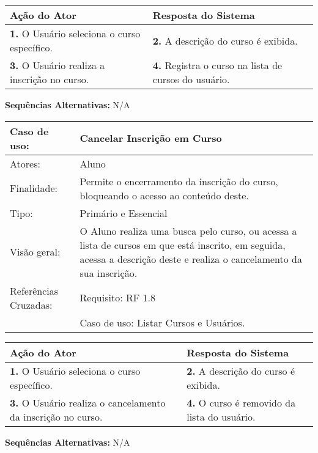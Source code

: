 \documentclass[12pt,a4paper,onecolumn,titlepage]{article}
\begin{document}
\begin{center}
\def\arraystretch{1.1}
\begin{tabular}{|p{6cm}|p{6cm}|}

\hline
\textbf{Ação do Ator} & \textbf{Resposta do Sistema} \\ \hline
\textbf{1.} O Usuário seleciona o curso específico. & \textbf{2.} A descrição do curso é exibida. \\ \hline
\textbf{3.} O Usuário realiza a inscrição no curso. & \textbf{4.} Registra o curso na lista de cursos do usuário. \\ \hline
\end{tabular}
\end{center}
\textbf{Sequências Alternativas:} N/A
\newpage



\begin{table}[h!]
\begin{center}
\begin{tabular}{p{2.5cm} p{9.5cm}}
Caso de uso: & \textbf{Cancelar Inscrição em Curso} \\ \hline
Atores: & Aluno \\ \hline
Finalidade: & Permite o encerramento da inscrição do curso, bloqueando o acesso ao conteúdo deste. \\ \hline
Tipo: & Primário e Essencial\\ \hline
Visão geral: & O Aluno realiza uma busca pelo curso, ou acessa a lista de cursos em que está inscrito, em seguida, acessa a descrição deste e realiza o cancelamento da sua inscrição. \\ \hline
Referências Cruzadas: & Requisito: RF 1.8 \\ & Caso de uso: Listar Cursos e Usuários.
\end{tabular}
\end{center}
\end{table}


\begin{center}
\def\arraystretch{1.1}
\begin{tabular}{|p{6cm}|p{6cm}|}

\hline
\textbf{Ação do Ator} & \textbf{Resposta do Sistema} \\ \hline
\textbf{1.} O Usuário seleciona o curso específico. & \textbf{2.} A descrição do curso é exibida. \\ \hline
\textbf{3.} O Usuário realiza o cancelamento da inscrição no curso. & \textbf{4.} O curso é removido da lista do usuário. \\ \hline
\end{tabular}
\end{center}
\textbf{Sequências Alternativas:} N/A
\end{document}
